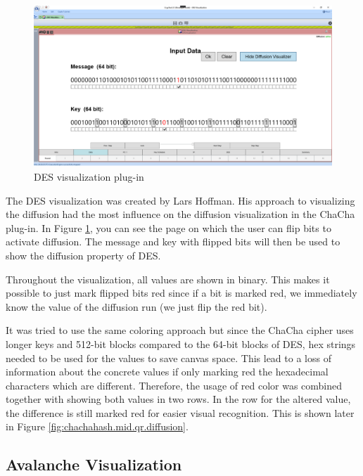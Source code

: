 \begin{figure}
\centering
\includegraphics[width=\textwidth]{figures/ct2/des.png}
\caption{DES visualization plug-in}
\label{fig:des}
\end{figure}

The DES visualization was created by Lars Hoffman. His approach to visualizing the diffusion had the most influence on the diffusion visualization in the ChaCha plug-in. In Figure \ref{fig:des}, you can see the page on which the user can flip bits to activate diffusion. The message and key with flipped bits will then be used to show the diffusion property of DES. 

Throughout the visualization, all values are shown in binary. This makes it possible to just mark flipped bits red since if a bit is marked red, we immediately know the value of the diffusion run (we just flip the red bit). 

It was  tried to use the same coloring approach but since the ChaCha cipher uses longer keys and 512-bit blocks compared to the 64-bit blocks of DES, hex strings needed to be used for the values to save canvas space. This lead to a loss of information about the concrete values if only marking red the hexadecimal characters which are different. Therefore, the usage of red color was combined together with showing both values in two rows. In the row for the altered value, the difference is still marked red for easier visual recognition. This is shown later in Figure \ref{fig:chachahash.mid.qr.diffusion}.

\vfill

\pagebreak

\subsection{Avalanche Visualization}
\label{sec:avalancheVisualization}

